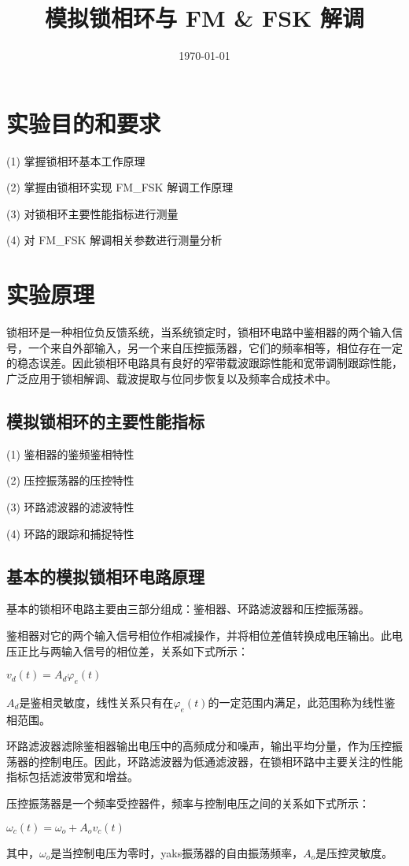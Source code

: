 \documentclass{../source/Experiment}
\title{模拟锁相环与 FM \& FSK 解调}
\date{\today}
\begin{document}
\section{实验目的和要求}
 (1) 掌握锁相环基本工作原理

(2) 掌握由锁相环实现 FM\_FSK 解调工作原理

(3) 对锁相环主要性能指标进行测量

(4) 对 FM\_FSK 解调相关参数进行测量分析


\section{实验原理}
锁相环是一种相位负反馈系统，当系统锁定时，锁相环电路中鉴相器的两个输入信号，一个来自外部输入，另一个来自压控振荡器，它们的频率相等，相位存在一定的稳态误差。因此锁相环电路具有良好的窄带载波跟踪性能和宽带调制跟踪性能，广泛应用于锁相解调、载波提取与位同步恢复以及频率合成技术中。

\subsection{模拟锁相环的主要性能指标}

(1) 鉴相器的鉴频鉴相特性

(2) 压控振荡器的压控特性

(3) 环路滤波器的滤波特性

(4) 环路的跟踪和捕捉特性
\subsection{基本的模拟锁相环电路原理}

基本的锁相环电路主要由三部分组成：鉴相器、环路滤波器和压控振荡器。

鉴相器对它的两个输入信号相位作相减操作，并将相位差值转换成电压输出。此电压正比与两输入信号的相位差，关系如下式所示：

$v_d(t) = A_d\varphi_e (t)$

$A_d$是鉴相灵敏度，线性关系只有在$\varphi_e(t)$的一定范围内满足，此范围称为线性鉴相范围。

环路滤波器滤除鉴相器输出电压中的高频成分和噪声，输出平均分量，作为压控振荡器的控制电压。因此，环路滤波器为低通滤波器，在锁相环路中主要关注的性能指标包括滤波带宽和增益。

压控振荡器是一个频率受控器件，频率与控制电压之间的关系如下式所示：

$\omega_c(t) = \omega_o + A_o v_c(t)$

其中，$\omega_o$是当控制电压为零时，yaks振荡器的自由振荡频率，$A_o$是压控灵敏度。
\end{document}
